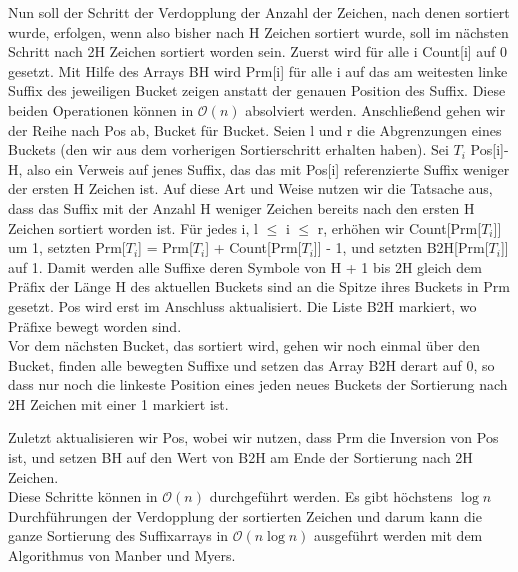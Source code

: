 \documentclass[twoside]{article}
\begin{document}
Nun soll der Schritt der Verdopplung der Anzahl der Zeichen, nach denen sortiert
wurde, erfolgen, wenn also bisher nach H Zeichen sortiert wurde, soll im nächsten
Schritt nach 2H Zeichen sortiert worden sein.
Zuerst wird für alle i Count[i] auf 0 gesetzt. Mit Hilfe des Arrays BH wird Prm[i]
für alle i auf das am weitesten linke Suffix des jeweiligen Bucket zeigen anstatt
der genauen Position des Suffix. Diese beiden Operationen können in $\mathcal{O}(n)$ absolviert werden.
Anschließend gehen wir der Reihe nach Pos ab, Bucket für Bucket. Seien l und r
die Abgrenzungen eines Buckets (den wir aus dem vorherigen Sortierschritt erhalten haben).
Sei $T_{i}$ Pos[i]-H, also ein Verweis auf jenes Suffix, das das mit Pos[i] referenzierte
Suffix weniger der ersten H Zeichen ist. Auf diese Art und Weise nutzen wir die
Tatsache aus, dass das Suffix mit der Anzahl H weniger Zeichen bereits nach den
ersten H Zeichen sortiert worden ist. Für jedes i, l $\le$ i $\le$ r, erhöhen wir Count[Prm[$T_{i}$]]
um 1, setzten Prm[$T_{i}$] = Prm[$T_{i}$] + Count[Prm[$T_{i}$]] - 1, und setzten B2H[Prm[$T_{i}$]]
auf 1.
Damit werden alle Suffixe deren Symbole von H + 1 bis 2H gleich dem Präfix der
Länge H des aktuellen Buckets sind an die Spitze ihres Buckets in Prm gesetzt.
Pos wird erst im Anschluss aktualisiert. Die Liste B2H markiert, wo Präfixe
bewegt worden sind. \\

Vor dem nächsten Bucket, das sortiert wird, gehen wir noch einmal über den Bucket,
finden alle bewegten Suffixe und setzen das Array B2H derart auf 0, so dass nur
noch die linkeste Position eines jeden neues Buckets der Sortierung nach 2H Zeichen
mit einer 1 markiert ist.

Zuletzt aktualisieren wir Pos, wobei wir nutzen, dass Prm die Inversion von Pos ist,
und setzen BH auf den Wert von B2H am Ende der Sortierung nach 2H Zeichen. \\

Diese Schritte können in $\mathcal{O}(n)$ durchgeführt werden. Es gibt höchstens $\log{} n$
Durchführungen der Verdopplung der sortierten Zeichen und darum kann die ganze
Sortierung des Suffixarrays in $\mathcal{O}(n \log{} n)$ ausgeführt werden mit dem Algorithmus
von Manber und Myers.
\end{document}
